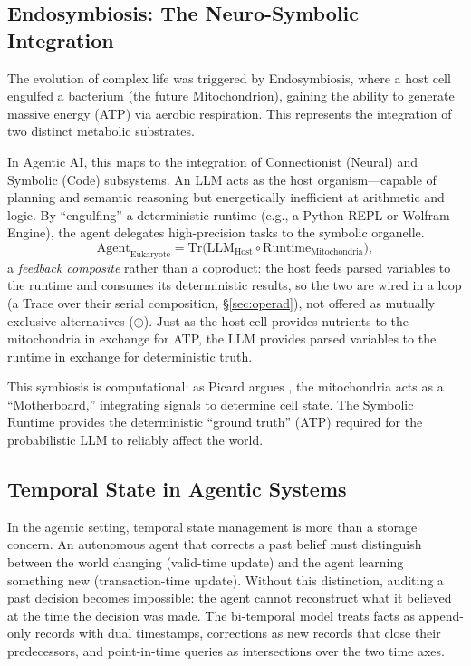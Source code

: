 \subsection{Endosymbiosis: The Neuro-Symbolic Integration}

The evolution of complex life was triggered by Endosymbiosis, where a host cell engulfed a bacterium (the future
Mitochondrion), gaining the ability to generate massive energy (ATP) via aerobic respiration. This represents the
integration of two distinct metabolic substrates.

In Agentic AI, this maps to the integration of Connectionist (Neural) and Symbolic (Code) subsystems. An LLM acts
as the host organism---capable of planning and semantic reasoning but energetically inefficient at arithmetic and
logic. By ``engulfing'' a deterministic runtime (e.g., a Python REPL or Wolfram Engine), the agent delegates
high-precision tasks to the symbolic organelle.
\begin{equation}
\mathrm{Agent}_{\text{Eukaryote}} = \mathrm{Tr}\bigl(\mathrm{LLM}_{\text{Host}} \circ \mathrm{Runtime}_{\text{Mitochondria}}\bigr),
\label{eq:endosymbiosis}
\end{equation}
a \emph{feedback composite} rather than a coproduct: the host feeds parsed variables to the runtime and
consumes its deterministic results, so the two are wired in a loop (a Trace over their serial composition,
\S\ref{sec:operad}), not offered as mutually exclusive alternatives ($\oplus$).
Just as the host cell provides nutrients to the mitochondria in exchange for ATP, the LLM provides parsed
variables to the runtime in exchange for deterministic truth.

This symbiosis is computational: as Picard argues \cite{picard2022mips}, the mitochondria acts as a ``Motherboard,''
integrating signals to determine cell state. The Symbolic Runtime provides the deterministic ``ground truth'' (ATP)
required for the probabilistic LLM to reliably affect the world.

\subsection{Temporal State in Agentic Systems}

In the agentic setting, temporal state management is more than a storage concern. An autonomous agent that corrects a past belief must distinguish between the world changing (valid-time update) and the agent learning something new (transaction-time update). Without this distinction, auditing a past decision becomes impossible: the agent cannot reconstruct what it believed at the time the decision was made. The bi-temporal model treats facts as append-only records with dual timestamps, corrections as new records that close their predecessors, and point-in-time queries as intersections over the two time axes.

